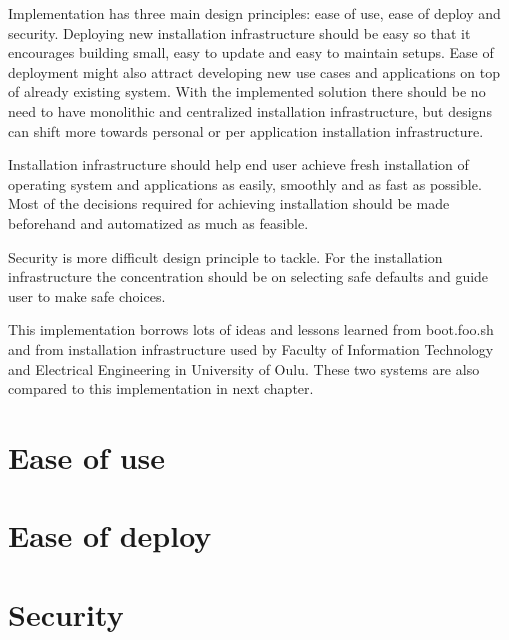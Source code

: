 
Implementation has three main design principles: ease of use, ease of
deploy and security. Deploying new installation infrastructure should
be easy so that it encourages building small, easy to update and easy
to maintain setups. Ease of deployment might also attract developing
new use cases and applications on top of already existing system. With
the implemented solution there should be no need to have monolithic
and centralized installation infrastructure, but designs can shift
more towards personal or per application installation infrastructure.

Installation infrastructure should help end user achieve fresh
installation of operating system and applications as easily, smoothly
and as fast as possible. Most of the decisions required for achieving
installation should be made beforehand and automatized as much as
feasible.

Security is more difficult design principle to tackle. For the
installation infrastructure the concentration should be on selecting
safe defaults and guide user to make safe choices.

This implementation borrows lots of ideas and lessons learned from
boot.foo.sh\cite{boot-foo-sh} and from installation infrastructure
used by Faculty of Information Technology and Electrical Engineering
in University of Oulu. These two systems are also compared to this
implementation in next chapter.

\section{Ease of use}

\section{Ease of deploy}

\section{Security}
